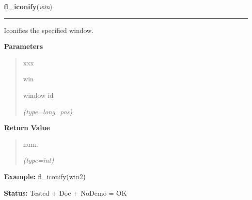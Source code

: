 \hspace{.8\funcindent}\begin{boxedminipage}{\funcwidth}

    \raggedright \textbf{fl\_iconify}(\textit{win})

    \vspace{-1.5ex}

    \rule{\textwidth}{0.5\fboxrule}
\setlength{\parskip}{2ex}
    Iconifies the specified window.

\setlength{\parskip}{1ex}
      \textbf{Parameters}
      \vspace{-1ex}

      \begin{quote}
        \begin{Ventry}{xxx}

          \item[win]

          window id

            {\it (type=long\_pos)}

        \end{Ventry}

      \end{quote}

      \textbf{Return Value}
    \vspace{-1ex}

      \begin{quote}
      num.

      {\it (type=int)}

      \end{quote}

\textbf{Example:} fl\_iconify(win2)



\textbf{Status:} Tested + Doc + NoDemo = OK



    \end{boxedminipage}

    \label{xformslib:flxbasic:fl_winresize}

    \vspace{0.5ex}

